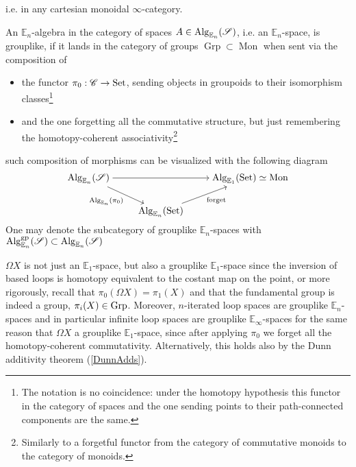     i.e. in any cartesian monoidal $\infty$-category.
\begin{defn}\label{grouplikeEspace}
    An $\mathbb{E}_n$-algebra in the category of spaces $A\in\operatorname{Alg}_{\mathbb{E}_n}(\mathscr{S})$, i.e. an $\mathbb{E}_{n}$-space,
    is grouplike, if it lands in the category of groups
    $\operatorname{Grp}\subset\operatorname{Mon}$ when sent via the composition of
    \begin{itemize}
        \item the functor $\pi_0:\mathscr{C}\to\operatorname{Set}$, sending objects in groupoids
        to their isomorphism classes\footnote{The notation is no coincidence: under the homotopy hypothesis
            this functor in the category of spaces 
            and the one sending points to their path-connected components are the same.}
        \item and the one forgetting
        all the commutative structure, but just remembering the homotopy-coherent
        associativity\footnote{Similarly to a forgetful functor 
            from the category of commutative monoids to the category of monoids.}
    \end{itemize} 
    such composition of morphisms can be visualized with the following diagram 
    \[\begin{tikzcd}[cramped]
        {\Alg_{\mathbb{E}_n}(\mathscr{S})} && {\Alg_{\mathbb{E}_1}(\Set)\simeq\operatorname{Mon}} \\
        & {\Alg_{\mathbb{E}_n}(\Set)}
        \arrow["{\Alg_{\mathbb{E}_n}(\pi_0)}"', from=1-1, to=2-2]
        \arrow["{\operatorname{forget}}"', from=2-2, to=1-3]
        \arrow[from=1-1, to=1-3]
    \end{tikzcd}\]
    One may denote the subcategory of grouplike $\mathbb{E}_n$-spaces with
    $\operatorname{Alg}^{\operatorname{gp}}_{\mathbb{E}_n}(\mathscr{S})\subset\operatorname{Alg}_{\mathbb{E}_n}(\mathscr{S})$
\end{defn}
\begin{ex}
    $\Omega X$ is not just an $\mathbb{E}_1$-space, but also a grouplike $\mathbb{E}_1$-space since
    the inversion of based loops is homotopy equivalent to the costant map on the point, or more
    rigorously, recall that $\pi_0(\Omega X)=\pi_1(X)$ and that the fundamental group is indeed a group,
     $\pi_i(X)\in\operatorname{Grp}$. Moreover, $n$-iterated loop spaces are grouplike $\mathbb{E}_{n}$-spaces and in
      particular infinite loop spaces
     are grouplike $\mathbb{E}_{\infty}$-spaces for the same reason that $\Omega X$ a grouplike
      $\mathbb{E}_1$-space, since after applying $\pi_0$ we forget all the homotopy-coherent 
      commutativity. Alternatively, this holds also
    by the Dunn additivity theorem (\ref{DunnAdds}).
\end{ex}


